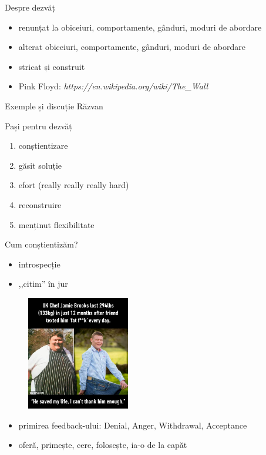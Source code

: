 \documentclass{beamer}
\begin{document}
\begin{frame}{Despre dezvăț}
  \begin{itemize}
    \pause \item renunțat la obiceiuri, comportamente, gânduri, moduri de abordare
    \pause \item alterat obiceiuri, comportamente, gânduri, moduri de abordare
    \pause \item stricat și construit
    \pause \item Pink Floyd: \textit{https://en.wikipedia.org/wiki/The\_Wall}
  \end{itemize}
\end{frame}

\begin{frame}{Exemple și discuție}
  Răzvan
\end{frame}

\begin{frame}{Pași pentru dezvăț}
  \begin{enumerate}
    \pause \item conștientizare
    \pause \item găsit soluție
    \pause \item efort (really really really hard)
    \pause \item reconstruire
    \pause \item menținut flexibilitate
  \end{enumerate}
\end{frame}

\begin{frame}{Cum conștientizăm?}
  \begin{itemize}
    \pause \item introspecție
    \pause \item ,,citim'' în jur
  \end{itemize}
  \pause
  \begin{figure}
    \centering
    \includegraphics[width=0.4\textwidth]{img/getting-nasty-feedback.jpg}
  \end{figure}
  \begin{itemize}
    \pause \item primirea feedback-ului: Denial, Anger, Withdrawal, Acceptance
    \pause \item oferă, primește, cere, folosește, ia-o de la capăt
  \end{itemize}
\end{frame}
\end{document}
